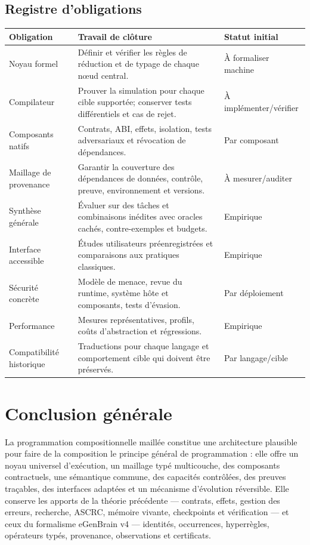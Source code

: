 \documentclass[11pt,a4paper,openany]{book}
\theoremstyle{definition}
\theoremstyle{plain}
\theoremstyle{remark}
\begin{document}
\section{Registre d'obligations}
\begin{longtable}{p{}p{}p{}}
\toprule
\textbf{Obligation} & \textbf{Travail de clôture} & \textbf{Statut initial}\\
\midrule
Noyau formel & Définir et vérifier les règles de réduction et de typage de chaque nœud central. & À formaliser machine\\
Compilateur & Prouver la simulation pour chaque cible supportée; conserver tests différentiels et cas de rejet. & À implémenter/vérifier\\
Composants natifs & Contrats, ABI, effets, isolation, tests adversariaux et révocation de dépendances. & Par composant\\
Maillage de provenance & Garantir la couverture des dépendances de données, contrôle, preuve, environnement et versions. & À mesurer/auditer\\
Synthèse générale & Évaluer sur des tâches et combinaisons inédites avec oracles cachés, contre-exemples et budgets. & Empirique\\
Interface accessible & Études utilisateurs préenregistrées et comparaisons aux pratiques classiques. & Empirique\\
Sécurité concrète & Modèle de menace, revue du runtime, système hôte et composants, tests d'évasion. & Par déploiement\\
Performance & Mesures représentatives, profils, coûts d'abstraction et régressions. & Empirique\\
Compatibilité historique & Traductions pour chaque langage et comportement cible qui doivent être préservés. & Par langage/cible\\
\bottomrule
\end{longtable}

\chapter{Conclusion générale}
La programmation compositionnelle maillée constitue une architecture plausible pour faire de la composition le principe général de programmation : elle offre un noyau universel d'exécution, un maillage typé multicouche, des composants contractuels, une sémantique commune, des capacités contrôlées, des preuves traçables, des interfaces adaptées et un mécanisme d'évolution réversible. Elle conserve les apports de la théorie précédente — contrats, effets, gestion des erreurs, recherche, ASCRC, mémoire vivante, checkpoints et vérification — et ceux du formalisme eGenBrain v4 — identités, occurrences, hyperrègles, opérateurs typés, provenance, observations et certificats.
\end{document}
